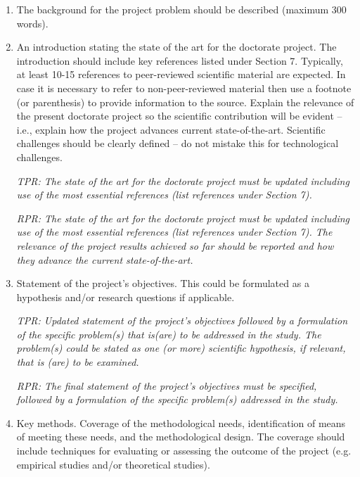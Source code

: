 \documentclass[12pt]{article}
\begin{document}
\begin{enumerate}
\item The background for the project problem should be described (maximum 300 words).
\item An introduction stating the state of the art for the doctorate project. The introduction should include key references listed under Section 7. Typically, at least 10-15 references to peer-reviewed scientific material are expected. In case it is necessary to refer to non-peer-reviewed material then use a footnote (or parenthesis) to provide information to the source. Explain the relevance of the present doctorate project so the scientific contribution will be evident -- i.e., explain how the project advances current state-of-the-art. Scientific challenges should be clearly defined -- do not mistake this for technological challenges.

\begin{shaded}
\noindent
\emph{TPR: The state of the art for the doctorate project must be updated including use of the most essential references (list references under Section 7).}

\noindent
\emph{RPR: The state of the art for the doctorate project must be updated including use of the most essential references (list references under Section 7). The relevance of the project results achieved so far should be reported and how they advance the current state-of-the-art.}
\end{shaded}

\item Statement of the project's objectives. This could be formulated as a hypothesis and/or research questions if applicable.

\begin{shaded}
\emph{TPR: Updated statement of the project's objectives followed by a formulation of the specific problem(s) that is(are) to be addressed in the study. The problem(s) could be stated as one (or more) scientific hypothesis, if relevant, that is (are) to be examined.}

\emph{RPR: The final statement of the project's objectives must be specified, followed by a formulation of the specific problem(s) addressed in the study.}
\end{shaded}

\item Key methods. Coverage of the methodological needs, identification of means of meeting these needs, and the methodological design. The coverage should include techniques for evaluating or assessing the outcome of the project (e.g. empirical studies and/or theoretical studies).


\end{enumerate}
\end{document}
